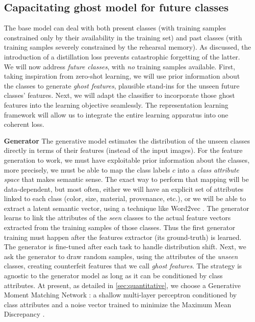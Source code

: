 \subsection{Capacitating ghost model for future classes}

The base model can deal with both present classes (with training samples constrained only by their
availability in the training set)  and past classes (with training samples severely constrained by
the rehearsal memory). As discussed, the introduction of a distillation loss prevents catastrophic
forgetting of the latter. We will now address \textit{future classes}, with \textit{no} training
samples available. First, taking inspiration from zero-shot learning, we will use prior information
about the classes to generate \textit{ghost features}, plausible stand-ins for the unseen future
classes' features. Next, we will adapt the classifier to incorporate those ghost features into the
learning objective seamlessly. The representation learning framework will allow us to integrate the
entire learning apparatus into one coherent loss.

\textbf{Generator} The generative model estimates the distribution of the unseen classes directly
in terms of their features (instead of the input images). For the feature generation to work, we
must have exploitable prior information about the classes, more precisely, we must be able to map
the class labels $c$ into a \textit{class attribute space} that makes semantic sense. The exact way
to perform that mapping will be data-dependent, but most often, either we will have an explicit set
of attributes linked to each class (color, size, material, provenance, etc.), or we will be able to
extract a latent semantic vector, using a technique like Word2vec
\cite{mikolov2013word2vec,pennington2014glove}. The generator learns to link the attributes of the
\textit{seen} classes to the actual feature vectors extracted from the training samples of those
classes. Thus the first generator training must happen after the features extractor (its
ground-truth) is learned. The generator is fine-tuned after each task to handle distribution shift.
Next, we ask the generator to draw random samples, using the attributes of the \textit{unseen}
classes, creating counterfeit features that we call \textit{ghost features}. The strategy is
agnostic to the generator model as long as it can be conditioned by class attributes.  At present,
as detailed in \autoref{sec:quantitative}, we choose a Generative Moment Matching Network
\cite{li2015gmmn}: a shallow multi-layer perceptron conditioned by class attributes and a noise
vector trained to minimize the Maximum Mean Discrepancy
\cite{gretton2007twosampleMMD,gretton2012twosampletestMMD}.

